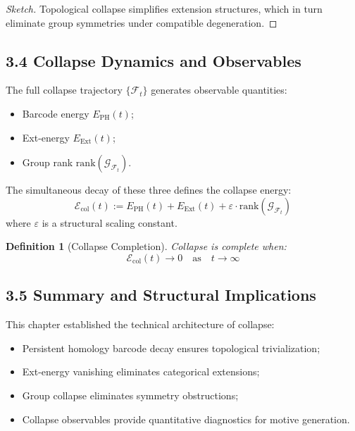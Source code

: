 \documentclass[11pt]{article}
\newtheorem{definition}[theorem]{Definition}
\begin{document}
\begin{proof}[Sketch]
Topological collapse simplifies extension structures, which in turn eliminate group symmetries under compatible degeneration.
\end{proof}

\subsection{3.4 Collapse Dynamics and Observables}

The full collapse trajectory $\{\mathcal{F}_t\}$ generates observable quantities:

\begin{itemize}
    \item Barcode energy $E_{\mathrm{PH}}(t)$;
    \item Ext-energy $E_{\mathrm{Ext}}(t)$;
    \item Group rank $\mathrm{rank}(\mathcal{G}_{\mathcal{F}_t})$.
\end{itemize}

The simultaneous decay of these three defines the collapse energy:
\[
\mathcal{E}_{\mathrm{col}}(t) := E_{\mathrm{PH}}(t) + E_{\mathrm{Ext}}(t) + \varepsilon \cdot \mathrm{rank}(\mathcal{G}_{\mathcal{F}_t})
\]
where $\varepsilon$ is a structural scaling constant.

\begin{definition}[Collapse Completion]
Collapse is complete when:
\[
\mathcal{E}_{\mathrm{col}}(t) \to 0 \quad \text{as} \quad t \to \infty
\]
\end{definition}

\subsection{3.5 Summary and Structural Implications}

This chapter established the technical architecture of collapse:

\begin{itemize}
    \item Persistent homology barcode decay ensures topological trivialization;
    \item Ext-energy vanishing eliminates categorical extensions;
    \item Group collapse eliminates symmetry obstructions;
    \item Collapse observables provide quantitative diagnostics for motive generation.
\end{itemize}
\end{document}

